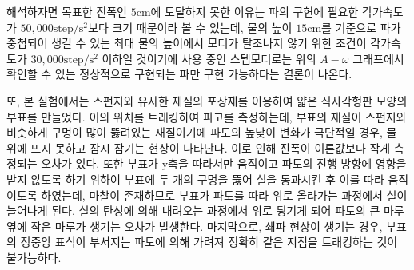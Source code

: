 해석하자면 목표한 진폭인 $5\mathrm{cm}$에 도달하지 못한 이유는 파의 구현에 필요한 각가속도가 $50,000\mathrm{step/s^2}$보다 크기 때문이라 볼 수 있는데, 물의 높이 $15\mathrm{cm}$를 기준으로 파가 중첩되어 생길 수 있는 최대 물의 높이에서 모터가 탈조나지 않기 위한 조건이 각가속도가 $30,000\mathrm{step/s^2}$ 이하일 것이기에 사용 중인 스텝모터로는 위의 $A-\omega$ 그래프에서 확인할 수 있는 정상적으로 구현되는 파만 구현 가능하다는 결론이 나온다.




또, 본 실험에서는 스펀지와 유사한 재질의 포장재를 이용하여 얇은 직사각형판 모양의 부표를 만들었다. 이의 위치를 트래킹하여 파고를 측정하는데, 부표의 재질이 스펀지와 비슷하게 구멍이 많이 뚫려있는 재질이기에 파도의 높낮이 변화가 극단적일 경우, 물 위에 뜨지 못하고 잠시 잠기는 현상이 나타난다. 이로 인해 진폭이 이론값보다 작게 측정되는 오차가 있다. 또한 부표가 y축을 따라서만 움직이고 파도의 진행 방향에 영향을 받지 않도록 하기 위하여 부표에 두 개의 구멍을 뚫어 실을 통과시킨 후 이를 따라 움직이도록 하였는데, 마찰이 존재하므로 부표가 파도를 따라 위로 올라가는 과정에서 실이 늘어나게 된다. 실의 탄성에 의해 내려오는 과정에서 위로 튕기게 되어 파도의 큰 마루 옆에 작은 마루가 생기는 오차가 발생한다. 마지막으로, 쇄파 현상이 생기는 경우, 부표의 정중앙 표식이 부서지는 파도에 의해 가려져 정확히 같은 지점을 트래킹하는 것이 불가능하다.

